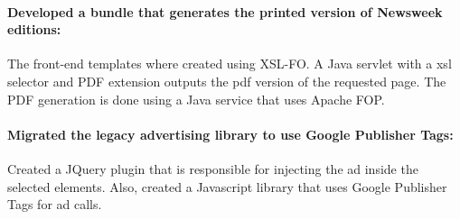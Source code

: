 \paragraph{Developed a bundle that generates the printed version of Newsweek editions:}
The front-end templates where created using XSL-FO.
A Java servlet with a xsl selector and PDF extension outputs the pdf version of the requested page.
The PDF generation is done using a Java service that uses Apache FOP.

\paragraph {Migrated the legacy advertising library to use Google Publisher Tags:}
Created a JQuery plugin that is responsible for injecting the ad inside the selected elements.
Also, created a Javascript library that uses Google Publisher Tags for ad calls.

